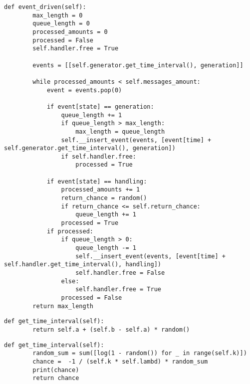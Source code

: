\begin{center}
\captionsetup{justification=raggedright,singlelinecheck=off}
\begin{lstlisting}[label=lst:event-driven,caption=Реализация управляющей программы событийного принципа]
def event_driven(self):
        max_length = 0
        queue_length = 0
        processed_amounts = 0
        processed = False
        self.handler.free = True

        events = [[self.generator.get_time_interval(), generation]]

        while processed_amounts < self.messages_amount:
            event = events.pop(0)

            if event[state] == generation:
                queue_length += 1
                if queue_length > max_length:
                    max_length = queue_length
                self.__insert_event(events, [event[time] + self.generator.get_time_interval(), generation])
                if self.handler.free:
                    processed = True

            if event[state] == handling:
                processed_amounts += 1
                return_chance = random()
                if return_chance <= self.return_chance:
                    queue_length += 1
                processed = True
            if processed:
                if queue_length > 0:
                    queue_length -= 1
                    self.__insert_event(events, [event[time] + self.handler.get_time_interval(), handling])
                    self.handler.free = False
                else:
                    self.handler.free = True
                processed = False
        return max_length
\end{lstlisting}
\end{center}

\clearpage

\begin{center}
\captionsetup{justification=raggedright,singlelinecheck=off}
\begin{lstlisting}[label=lst:normal,caption=Вычисление интервала времени между появлениями сообщений по равномерному закону распределения]
def get_time_interval(self):
        return self.a + (self.b - self.a) * random()
\end{lstlisting}
\end{center}

\begin{center}
\captionsetup{justification=raggedright,singlelinecheck=off}
\begin{lstlisting}[label=lst:erlang,caption=Вычисление времени обработки сообщения по закону распределения Эрланга]
def get_time_interval(self):
        random_sum = sum([log(1 - random()) for _ in range(self.k)])
        chance =  -1 / (self.k * self.lambd) * random_sum
        print(chance)
        return chance
\end{lstlisting}
\end{center}

